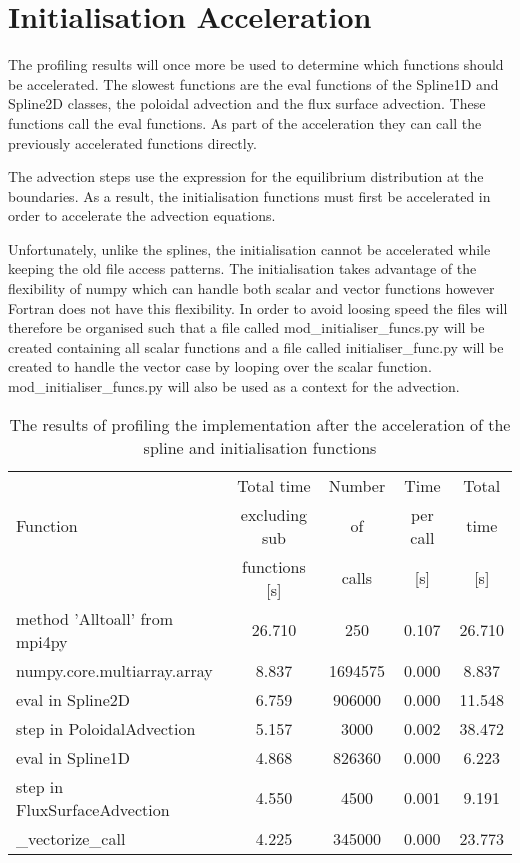 \section{Initialisation Acceleration}

The profiling results will once more be used to determine which functions should be accelerated. The slowest functions are the eval functions of the Spline1D and Spline2D classes, the poloidal advection and the flux surface advection. These functions call the eval functions. As part of the acceleration they can call the previously accelerated functions directly.

The advection steps use the expression for the equilibrium distribution at the boundaries. As a result, the initialisation functions must first be accelerated in order to accelerate the advection equations.

Unfortunately, unlike the splines, the initialisation cannot be accelerated while keeping the old file access patterns. The initialisation takes advantage of the flexibility of numpy which can handle both scalar and vector functions however Fortran does not have this flexibility. In order to avoid loosing speed the files will therefore be organised such that a file called mod\_initialiser\_funcs.py will be created containing all scalar functions and a file called initialiser\_func.py will be created to handle the vector case by looping over the scalar function. mod\_initialiser\_funcs.py will also be used as a context for the advection.

\begin{table}[ht]
\centering
 \begin{tabular}{|m{}|c|c|c|c|}
  \hline
          & Total time & Number & Time & Total \\
  Function & excluding sub & of & per call & time \\
          & functions [s] & calls & [s] & [s] \\
  \hline
  \hline
  method 'Alltoall' from mpi4py & 26.710 & 250 & 0.107 & 26.710 \\
  \hline
  numpy.core.multiarray.array & 8.837 & 1694575 & 0.000 & 8.837 \\
  \hline
  eval in Spline2D & 6.759 & 906000 & 0.000 & 11.548\\
  \hline
  step in PoloidalAdvection & 5.157 & 3000 & 0.002 & 38.472\\
  \hline
  eval in Spline1D & 4.868 & 826360 & 0.000 & 6.223\\
  \hline
  step in FluxSurfaceAdvection & 4.550 & 4500 & 0.001 & 9.191\\
  \hline
  \_vectorize\_call & 4.225 & 345000 & 0.000 & 23.773\\
  \hline
 \end{tabular}
 \caption{\label{tab::init profile} The results of profiling the implementation after the acceleration of the spline and initialisation functions}
\end{table}

